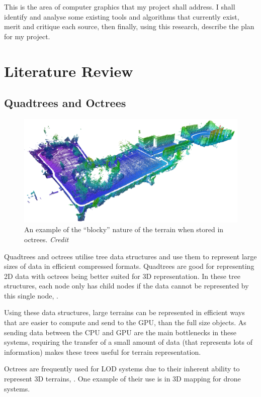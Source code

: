 \documentclass[notitlepage,12pt]{article}
\begin{document}
This is the area of computer graphics that my project shall address. I shall identify and analyse some existing tools and algorithms that currently exist, merit and critique each source, then finally, using this research, describe the plan for my project.

\section{Literature Review}

\subsection{Quadtrees and Octrees}

\begin{figure}[ht]
  \centering
  \includegraphics[width=1.0\textwidth]{octomap.png}
  \caption{An example of the ``blocky'' nature of the terrain when stored in octrees. \textit{Credit \cite{octrees}}}
  \label{fig:octrees}
\end{figure}

Quadtrees and octrees utilise tree data structures and use them to represent large sizes of data in efficient compressed formats. Quadtrees are good for representing 2D data with octrees being better suited for 3D representation. In these tree structures, each node only has child nodes if the data cannot be represented by this single node, \cite{quadtreesOctrees}. 

Using these data structures, large terrains can be represented in efficient ways that are easier to compute and send to the GPU, than the full size objects. As sending data between the CPU and GPU are the main bottlenecks in these systems, requiring the transfer of a small amount of data (that represents lots of information) makes these trees useful for terrain representation.

Octrees are frequently used for LOD systems due to their inherent ability to represent 3D terrains, \cite{lod}. One example of their use is in 3D mapping for drone systems. 
\end{document}

